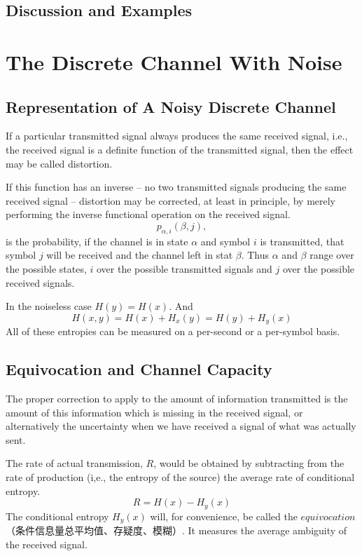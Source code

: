 \documentclass[conference]{IEEEtran}
\begin{document}
\subsection{Discussion and Examples}

\section{The Discrete Channel With Noise}
\subsection{Representation of A Noisy Discrete Channel}
If a particular transmitted signal always produces the same received signal, i.e., the received signal is a definite function of the transmitted signal, then the effect may be called distortion.

If this function has an inverse -- no two transmitted signals producing the same received signal -- distortion may be corrected, at least in principle, by merely performing the inverse functional operation on the received signal.
\[
p_{\alpha,i}(\beta,j),
\]
is the probability, if the channel is in state $\alpha$ and symbol $i$ is transmitted, that symbol $j$ will be received and the channel left in stat $\beta$. Thus $\alpha$ and $\beta$ range over the possible states, $i$ over the possible transmitted signals and $j$ over the possible received signals.

In the noiseless case $H(y) = H(x)$. And
\[H(x,y)=H(x)+H_{x}(y)=H(y)+H_{y}(x)\]
All of these entropies can be measured on a per-second or a per-symbol basis.
\subsection{Equivocation and Channel Capacity}

The proper correction to apply to the amount of information transmitted is the amount of this information which is missing in the received signal, or alternatively the uncertainty when we have received a signal of what was actually sent.



The rate of actual transmission, $R$, would be obtained by subtracting from the rate of production (i,e., the entropy of the source) the average rate of conditional entropy.
\[R=H(x)-H_{y}(x)\]
The conditional entropy $H_{y}(x)$ will, for convenience, be called
the $equivocation$
（条件信息量总平均值、存疑度、模糊）. It measures the average ambiguity of the received signal.
\end{document}
